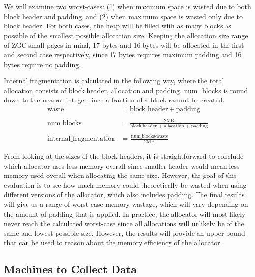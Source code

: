 We will examine two worst-cases: (1) when maximum space is wasted due to both block header and padding, and (2) when maximum space is wasted only due to block header. For both cases, the heap will be filled with as many blocks as possible of the smallest possible allocation size. Keeping the allocation size range of ZGC small pages in mind, 17 bytes and 16 bytes will be allocated in the first and second case respectively, since 17 bytes requires maximum padding and 16 bytes require no padding.

Internal fragmentation is calculated in the following way, where the total allocation consists of block header, allocation and padding. num\_blocks is round down to the nearest integer since a fraction of a block cannot be created.
\begin{align*}
    \text{waste} &= \text{block\_header} + \text{padding} \\\\
    \text{num\_blocks} &= \frac{2\text{MB}}{\text{block\_header + allocation + padding}} \\\\
    \text{internal\_fragmentation} &= \frac{\text{num\_blocks} \cdot \text{waste}}{2\text{MB}}
\end{align*}

From looking at the sizes of the block headers, it is straightforward to conclude which allocator uses less memory overall since smaller header would mean less memory used overall when allocating the same size. However, the goal of this evaluation is to see how much memory could theoretically be wasted when using different versions of the allocator, which also includes padding. The final results will give us a range of worst-case memory wastage, which will vary depending on the amount of padding that is applied. In practice, the allocator will most likely never reach the calculated worst-case since all allocations will unlikely be of the same and lowest possible size. However, the results will provide an upper-bound that can be used to reason about the memory efficiency of the allocator.




\subsection{Machines to Collect Data}

